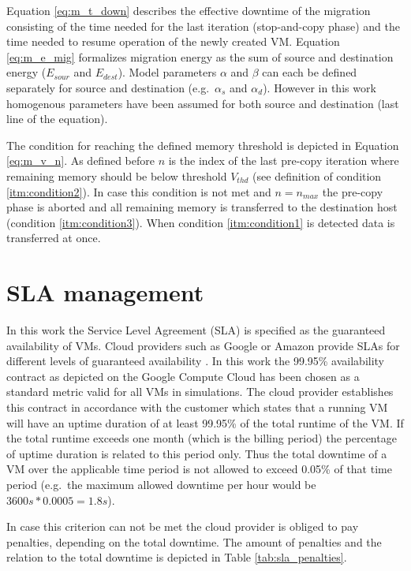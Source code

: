 Equation \ref{eq:m_t_down} describes the effective downtime of the migration consisting of the time needed for the last iteration (stop-and-copy phase) and the time needed to resume operation of the newly created VM. Equation \ref{eq:m_e_mig} formalizes migration energy as the sum of source and destination energy ($E_{sour}$ and $E_{dest}$). Model parameters $\alpha$ and $\beta$ can each be defined separately for source and destination (e.g.~$\alpha_s$ and $\alpha_d$). However in this work homogenous parameters have been assumed for both source and destination (last line of the equation). 

The condition for reaching the defined memory threshold is depicted in Equation \ref{eq:m_v_n}. As defined before $n$ is the index of the last pre-copy iteration where remaining memory should be below threshold $V_{thd}$ (see definition of condition \ref{itm:condition2}). In case this condition is not met and $n = n_{max}$ the pre-copy phase is aborted and all remaining memory is transferred to the destination host (condition \ref{itm:condition3}). When condition \ref{itm:condition1} is detected data is transferred at once. 




\section{SLA management} \label{sec:sla_managemenet}

In this work the Service Level Agreement (SLA) is specified as the guaranteed availability of VMs. Cloud providers such as Google or Amazon provide SLAs for different levels of guaranteed availability \cite{google2015compute, amazon2013sla}. In this work the 99.95\% availability contract as depicted on the Google Compute Cloud \cite{google2015compute} has been chosen as a standard metric valid for all VMs in simulations. The cloud provider establishes this contract in accordance with the customer which states that a running VM will have an uptime duration of at least 99.95\% of the total runtime of the VM. If the total runtime exceeds one month (which is the billing period) the percentage of uptime duration is related to this period only. Thus the total downtime of a VM over the applicable time period is not allowed to exceed 0.05\% of that time period (e.g.~the maximum allowed downtime per hour would be $3600s * 0.0005 = 1.8s$). 

In case this criterion can not be met the cloud provider is obliged to pay penalties, depending on the total downtime. The amount of penalties and the relation to the total downtime is depicted in Table \ref{tab:sla_penalties}. 


